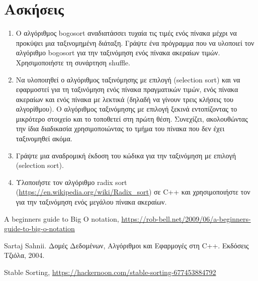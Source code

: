 \section{Ασκήσεις}
\begin{enumerate}
\item Ο αλγόριθμος bogosort αναδιατάσσει τυχαία τις τιμές ενός πίνακα μέχρι να προκύψει μια ταξινομημένη διάταξη. Γράψτε ένα πρόγραμμα που να υλοποιεί τον αλγόριθμο bogosort για την ταξινόμηση ενός πίνακα ακεραίων τιμών. Χρησιμοποιήστε τη συνάρτηση shuffle. 
\item Να υλοποιηθεί ο αλγόριθμος ταξινόμησης με επιλογή (selection sort) και να εφαρμοστεί για τη ταξινόμηση ενός πίνακα πραγματικών τιμών, ενός πίνακα ακεραίων και ενός πίνακα με λεκτικά (δηλαδή να γίνουν τρεις κλήσεις του αλγορίθμου). Ο αλγόριθμος ταξινόμησης με επιλογή ξεκινά εντοπίζοντας το μικρότερο στοιχείο και το τοποθετεί στη πρώτη θέση. Συνεχίζει, ακολουθώντας την ίδια διαδικασία χρησιμοποιώντας το τμήμα του πίνακα που δεν έχει ταξινομηθεί ακόμα. 
\item Γράψτε μια αναδρομική έκδοση του κώδικα για την ταξινόμηση με επιλογή (selection sort).
\item Υλοποιήστε τον αλγόριθμο radix sort (\href{https://en.wikipedia.org/wiki/Radix_sort}{https://en.wikipedia.org/wiki/Radix\_sort}) σε C++ και χρησιμοποιήστε τον για την ταξινόμηση ενός μεγάλου πίνακα ακεραίων.

\end{enumerate}


\begin{thebibliography}{9}
A beginners guide to Big O notation, \href{https://rob-bell.net/2009/06/a-beginners-guide-to-big-o-notation}{https://rob-bell.net/2009/06/a-beginners-guide-to-big-o-notation}

Sartaj Sahnii. Δομές Δεδομένων, Αλγόριθμοι και Εφαρμογές στη C++. Εκδόσεις Τζιόλα, 2004.

Stable Sorting, \href{https://hackernoon.com/stable-sorting-677453884792}{https://hackernoon.com/stable-sorting-677453884792}
\end{thebibliography}

